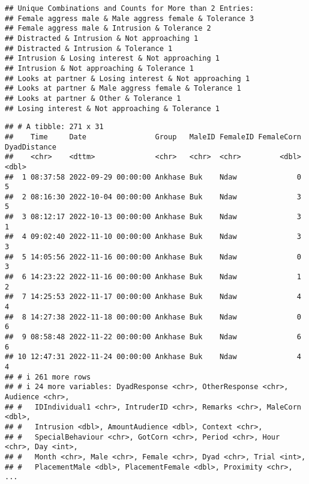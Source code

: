 \documentclass[
]{article}
\begin{document}
\begin{verbatim}
## Unique Combinations and Counts for More than 2 Entries:
## Female aggress male & Male aggress female & Tolerance 3
## Female aggress male & Intrusion & Tolerance 2
## Distracted & Intrusion & Not approaching 1
## Distracted & Intrusion & Tolerance 1
## Intrusion & Losing interest & Not approaching 1
## Intrusion & Not approaching & Tolerance 1
## Looks at partner & Losing interest & Not approaching 1
## Looks at partner & Male aggress female & Tolerance 1
## Looks at partner & Other & Tolerance 1
## Losing interest & Not approaching & Tolerance 1
\end{verbatim}

\begin{verbatim}
## # A tibble: 271 x 31
##    Time     Date                Group   MaleID FemaleID FemaleCorn DyadDistance
##    <chr>    <dttm>              <chr>   <chr>  <chr>         <dbl>        <dbl>
##  1 08:37:58 2022-09-29 00:00:00 Ankhase Buk    Ndaw              0            5
##  2 08:16:30 2022-10-04 00:00:00 Ankhase Buk    Ndaw              3            5
##  3 08:12:17 2022-10-13 00:00:00 Ankhase Buk    Ndaw              3            1
##  4 09:02:40 2022-11-10 00:00:00 Ankhase Buk    Ndaw              3            3
##  5 14:05:56 2022-11-16 00:00:00 Ankhase Buk    Ndaw              0            3
##  6 14:23:22 2022-11-16 00:00:00 Ankhase Buk    Ndaw              1            2
##  7 14:25:53 2022-11-17 00:00:00 Ankhase Buk    Ndaw              4            4
##  8 14:27:38 2022-11-18 00:00:00 Ankhase Buk    Ndaw              0            6
##  9 08:58:48 2022-11-22 00:00:00 Ankhase Buk    Ndaw              6            6
## 10 12:47:31 2022-11-24 00:00:00 Ankhase Buk    Ndaw              4            4
## # i 261 more rows
## # i 24 more variables: DyadResponse <chr>, OtherResponse <chr>, Audience <chr>,
## #   IDIndividual1 <chr>, IntruderID <chr>, Remarks <chr>, MaleCorn <dbl>,
## #   Intrusion <dbl>, AmountAudience <dbl>, Context <chr>,
## #   SpecialBehaviour <chr>, GotCorn <chr>, Period <chr>, Hour <chr>, Day <int>,
## #   Month <chr>, Male <chr>, Female <chr>, Dyad <chr>, Trial <int>,
## #   PlacementMale <dbl>, PlacementFemale <dbl>, Proximity <chr>, ...
\end{verbatim}
\end{document}
